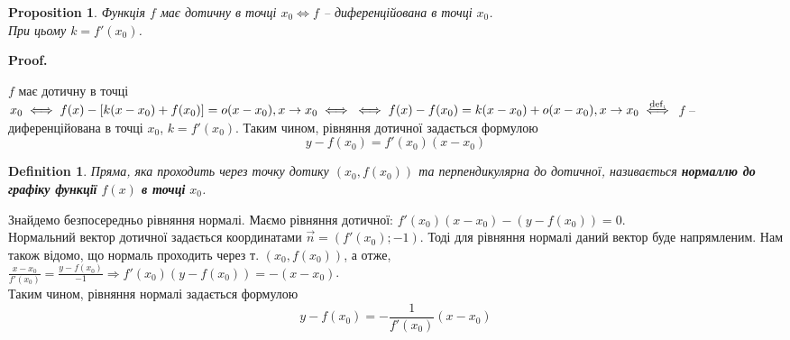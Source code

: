 \documentclass[a4paper, 14pt]{article}
\makeatletter
\def\qed{$\blacksquare$}
\theoremstyle{theoremdd}
\theoremstyle{theoremdd}
\newtheorem{definition}[theorem]{Definition}
\theoremstyle{theoremdd}
\theoremstyle{theoremdd}
\theoremstyle{theoremdd}
\newtheorem{proposition}[theorem]{Proposition}
\theoremstyle{theoremdd}
\theoremstyle{theoremdd}
\theoremstyle{theoremdd}
\renewenvironment{proof}[1][Proof.\\]{\par
\pushQED{\hfill \qed}%
\normalfont \topsep6\p@\@plus6\p@\relax
\trivlist
\item\relax
{\bfseries
#1\@addpunct{.}}\hspace\labelsep\ignorespaces
}{%
\popQED\endtrivlist\@endpefalse
}
\makeatother
\begin{document}
\begin{proposition}
Функція $f$ має дотичну в точці $x_0 \iff f$ -- диференційована в точці $x_0$. \\ При цьому $k = f'(x_0)$.
\end{proposition}

\begin{proof}
$f$ має дотичну в точці $x_0 \iff f(x) - [k(x-x_0)+f(x_0)] = o(x-x_0), x \to x_0 \iff \\ \iff f(x)-f(x_0) = k(x-x_0) + o(x-x_0), x \to x_0 \overset{\textrm{def.}}{\iff}$ $f$ -- диференційована в точці $x_0$, $k=f'(x_0)$.
\end{proof}
Таким чином, рівняння дотичної задається формулою $$y - f(x_0) = f'(x_0)(x-x_0)$$

\begin{definition}
Пряма, яка проходить через точку дотику $(x_0, f(x_0))$ та перпендикулярна до дотичної, називається \textbf{нормаллю до графіку функції} $f(x)$ \textbf{в точці} $x_0$.
\end{definition}

Знайдемо безпосередньо рівняння нормалі. Маємо рівняння дотичної:
$f'(x_0)(x-x_0) - (y-f(x_0)) = 0$.\\
Нормальний вектор дотичної задається координатами $\vec{n} = (f'(x_0); -1)$. Тоді для рівняння нормалі даний вектор буде напрямленим. Нам також відомо, що нормаль проходить через т. $(x_0,f(x_0))$, а отже,\\
$\displaystyle \frac{x-x_0}{f'(x_0)} = \frac{y-f(x_0)}{-1} \Rightarrow f'(x_0)(y-f(x_0)) = -(x-x_0)$.\\
Таким чином, рівняння нормалі задається формулою $$y-f(x_0) = \displaystyle -\frac{1}{f'(x_0)}(x-x_0)$$
\\ %
\end{document}
